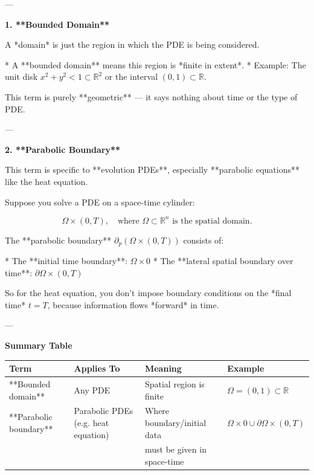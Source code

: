 \documentclass[12pt,a4paper]{report}
\begin{document}
---
\begin{description}

\item \textbf{ 1. **Bounded Domain**}

A *domain* is just the region in which the PDE is being considered.

* A **bounded domain** means this region is *finite in extent*.
* Example: The unit disk $ {x^2 + y^2 < 1} \subset \mathbb{R}^2 $ or the interval $ (0,1) \subset \mathbb{R} $.

This term is purely **geometric** — it says nothing about time or the type of PDE.

---

\item  \textbf{2. **Parabolic Boundary**}

This term is specific to **evolution PDEs**, especially **parabolic equations** like the heat equation.

Suppose you solve a PDE on a space-time cylinder:

$$
\Omega \times (0,T),\quad \text{where }\Omega\subset\mathbb{R}^n\text{ is the spatial domain}.
$$

The **parabolic boundary** $ \partial_p(\Omega \times (0,T)) $ consists of:

* The **initial time boundary**: $ \Omega \times {0} $
* The **lateral spatial boundary over time**: $ \partial\Omega \times (0,T) $

So for the heat equation, you don’t impose boundary conditions on the *final time* $t=T$, because information flows *forward* in time.

---

\item  \textbf{Summary Table}

\begin{tabular}{|l|l|l|l|}
\hline
Term  & Applies To  & Meaning  & Example \\
\hline
**Bounded domain**  & Any PDE  & Spatial region is finite & $ \Omega = (0,1) \subset \mathbb{R} $ \\
**Parabolic boundary** & Parabolic PDEs (e.g. heat equation) & Where boundary/initial data & $ \Omega\times{0} \cup \partial\Omega \times (0,T) $ \\
& &must be given in space-time & \\
\hline
\end{tabular}

\end{description}
\end{document}
